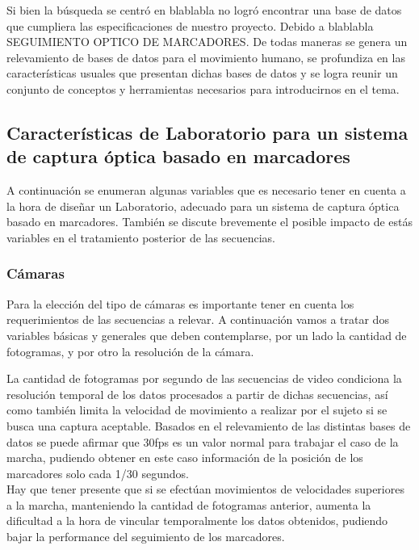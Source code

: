 Si bien la búsqueda se centró en blablabla no logró encontrar una base de datos que cumpliera las especificaciones de nuestro proyecto. Debido a blablabla SEGUIMIENTO OPTICO DE MARCADORES.
 De todas maneras se genera un relevamiento de bases de datos para el movimiento humano, se profundiza en las características usuales que presentan dichas bases de datos y se logra reunir un conjunto de conceptos y herramientas necesarios para introducirnos en el tema. 



\subsection{Características de Laboratorio para un sistema de captura óptica basado en marcadores}
\label{seccion_Caracteristicas_Laboratorio}
 
A continuación se enumeran algunas variables que es necesario tener en cuenta a la hora de diseñar un Laboratorio, adecuado para un sistema de captura óptica basado en marcadores. También se discute brevemente el posible impacto de estás variables en el tratamiento posterior de las secuencias.

\subsubsection{Cámaras}\label{parrafo_Camaras} 
Para la elección del tipo de cámaras es importante tener en cuenta los requerimientos de las secuencias a relevar. A continuación vamos a tratar dos variables básicas y generales que deben contemplarse, por un lado la cantidad de fotogramas, y por otro la resolución de la cámara.

La cantidad de fotogramas por segundo de las secuencias de video condiciona la resolución temporal de los datos procesados a partir de dichas secuencias, así como también limita la velocidad de movimiento a realizar por el sujeto si se busca una captura aceptable.
Basados en el relevamiento de las distintas bases de datos se puede afirmar que 30fps es un valor normal para trabajar el caso de la marcha, pudiendo obtener en este caso información de la posición de los marcadores solo cada 1/30 segundos.\\ 
Hay que tener presente que si se efectúan movimientos de velocidades superiores a la marcha, manteniendo la cantidad de fotogramas anterior, aumenta la dificultad a la hora de vincular temporalmente los datos obtenidos, pudiendo bajar la performance del seguimiento de los marcadores. 

